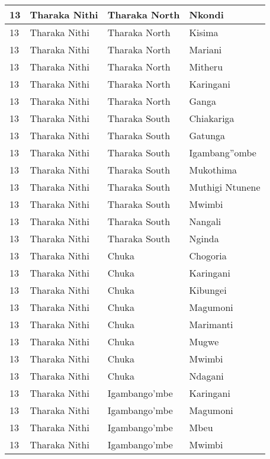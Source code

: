 \begin{table}[!ht]
\begin{tabular}{|l|l|l|l|}
        13 & Tharaka Nithi & Tharaka North & Nkondi \\ \hline
        13 & Tharaka Nithi & Tharaka North & Kisima \\ \hline
        13 & Tharaka Nithi & Tharaka North & Mariani \\ \hline
        13 & Tharaka Nithi & Tharaka North & Mitheru \\ \hline
        13 & Tharaka Nithi & Tharaka North & Karingani \\ \hline
        13 & Tharaka Nithi & Tharaka North & Ganga \\ \hline
        13 & Tharaka Nithi & Tharaka South & Chiakariga \\ \hline
        13 & Tharaka Nithi & Tharaka South & Gatunga \\ \hline
        13 & Tharaka Nithi & Tharaka South & Igambang''ombe \\ \hline
        13 & Tharaka Nithi & Tharaka South & Mukothima \\ \hline
        13 & Tharaka Nithi & Tharaka South & Muthigi Ntunene \\ \hline
        13 & Tharaka Nithi & Tharaka South & Mwimbi \\ \hline
        13 & Tharaka Nithi & Tharaka South & Nangali \\ \hline
        13 & Tharaka Nithi & Tharaka South & Nginda \\ \hline
        13 & Tharaka Nithi & Chuka & Chogoria \\ \hline
        13 & Tharaka Nithi & Chuka & Karingani \\ \hline
        13 & Tharaka Nithi & Chuka & Kibungei \\ \hline
        13 & Tharaka Nithi & Chuka & Magumoni \\ \hline
        13 & Tharaka Nithi & Chuka & Marimanti \\ \hline
        13 & Tharaka Nithi & Chuka & Mugwe \\ \hline
        13 & Tharaka Nithi & Chuka & Mwimbi \\ \hline
        13 & Tharaka Nithi & Chuka & Ndagani \\ \hline
        13 & Tharaka Nithi & Igambango’mbe & Karingani \\ \hline
        13 & Tharaka Nithi & Igambango’mbe & Magumoni \\ \hline
        13 & Tharaka Nithi & Igambango’mbe & Mbeu \\ \hline
        13 & Tharaka Nithi & Igambango’mbe & Mwimbi \\ \hline

\end{tabular}
\end{table}
